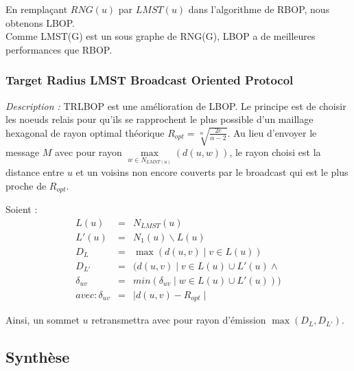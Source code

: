 En remplaçant $RNG(u)$ par $LMST(u)$ dans l'algorithme de RBOP, nous obtenons LBOP.\\

Comme LMST(G) est un sous graphe de RNG(G), LBOP a de meilleures performances que RBOP.

\subsubsection{Target Radius LMST Broadcast Oriented Protocol \cite{Ingelrest2004}}

\emph{Description :} TRLBOP est une amélioration de LBOP. Le principe est de choisir les noeuds relais pour qu'ils se rapprochent le plus possible d'un maillage hexagonal de rayon optimal théorique $R_{opt}=\sqrt[\alpha]{\frac{2c}{\alpha-2}}$. Au lieu d'envoyer le message $M$ avec pour rayon $\max\limits_{w\in N_{LMST(u)}}(d(u,w))$, le rayon choisi est la distance entre $u$ et un voisins non encore couverts par le broadcast qui est le plus proche de $R_{opt}$.


Soient :
\begin{eqnarray*}
L(u) & = & N_{LMST}(u) \label{eq:3}\\
L'(u) & = & N_1(u)\backslash L(u)\\
D_L & = & \max(d(u,v)\mid v \in L(u))\\
D_{L'} & = & (d(u,v)\mid v \in L(u)\cup L'(u)\wedge  \\
\delta_{uv} & = & min(\delta_{uv}\mid w \in L(u)\cup L'(u)))  \\
avec: \delta_{uv} & = & \mid d(u,v)-R_{opt}\mid  \label{eq:4}
\end{eqnarray*} 

Ainsi, un sommet $u$ retransmettra avec pour rayon d'émission $\max(D_L,D_{L'})$.


\subsection{Synthèse}

